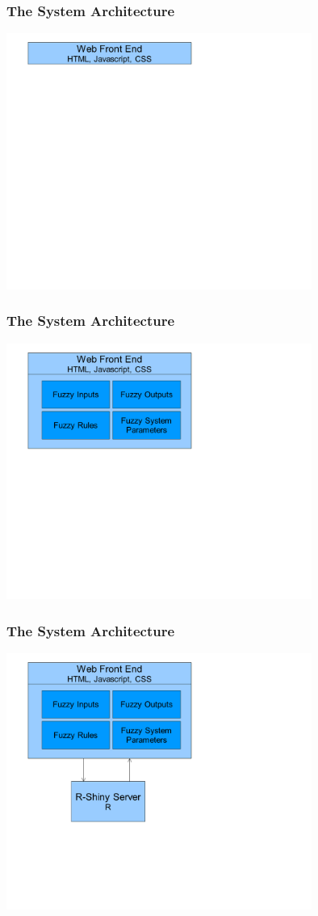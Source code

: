 \documentclass{beamer}
\begin{document}
\begin{frame}
	\frametitle{The System Architecture}
	\begin{center}
	\includegraphics[width=0.75\textwidth]{images/Picture1.png}
	\end{center}
\end{frame}
\begin{frame}
	\frametitle{The System Architecture}
	\begin{center}
	\includegraphics[width=0.75\textwidth]{images/Picture2.png}
	\end{center}
\end{frame}
\begin{frame}
	\frametitle{The System Architecture}
	\begin{center}
	\includegraphics[width=0.75\textwidth]{images/Picture3.png}
	\end{center}
\end{frame}
\end{document}
